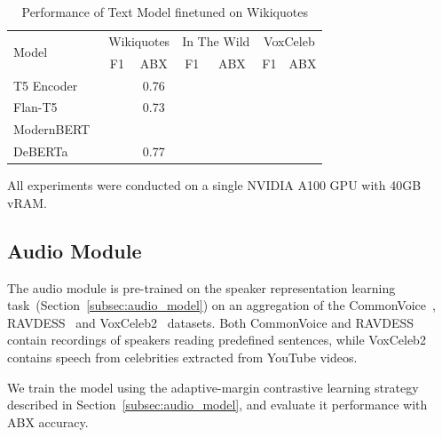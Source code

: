 \documentclass{Interspeech}
\begin{document}
\begin{table}[!htp]\centering
  \scriptsize
  \begin{tabular}{lcccccc}\toprule
    \multirow{2}{*}{Model}       & \multicolumn{2}{c}{Wikiquotes} & \multicolumn{2}{c}{In The Wild} & \multicolumn{2}{c}{VoxCeleb}                  \\\cmidrule{2-7}
                                 & F1                             & ABX                             & F1                           & ABX & F1 & ABX \\\cmidrule{1-7}
    T5 Encoder~\cite{t5}         &                                & 0.76                            &                              &     &    &     \\
    Flan-T5~\cite{flan-t5}       &                                & 0.73                            &                              &     &    &     \\
    ModernBERT~\cite{modernBERT} &                                &                                 &                              &     &    &     \\
    DeBERTa~\cite{deberta}       &                                & 0.77                            &                              &     &    &     \\\midrule
    \bottomrule
  \end{tabular}
  \caption{Performance of Text Model finetuned on Wikiquotes }\label{tab:results_text_model}
\end{table}

All experiments were conducted on a single NVIDIA A100 GPU with 40GB vRAM.

\subsection{Audio Module}

The audio module is pre-trained on the speaker representation learning
task~(Section~\ref{subsec:audio_model}) on an aggregation of the
CommonVoice~\cite{commonvoice}, RAVDESS~\cite{ravdess} and
VoxCeleb2~\cite{voxceleb2} datasets. Both CommonVoice and RAVDESS contain
recordings of speakers reading predefined sentences, while VoxCeleb2 contains
speech from celebrities extracted from YouTube videos.

We train the model using the adaptive-margin contrastive learning strategy
described in Section~\ref{subsec:audio_model}, and evaluate it performance with
ABX accuracy.
\end{document}
